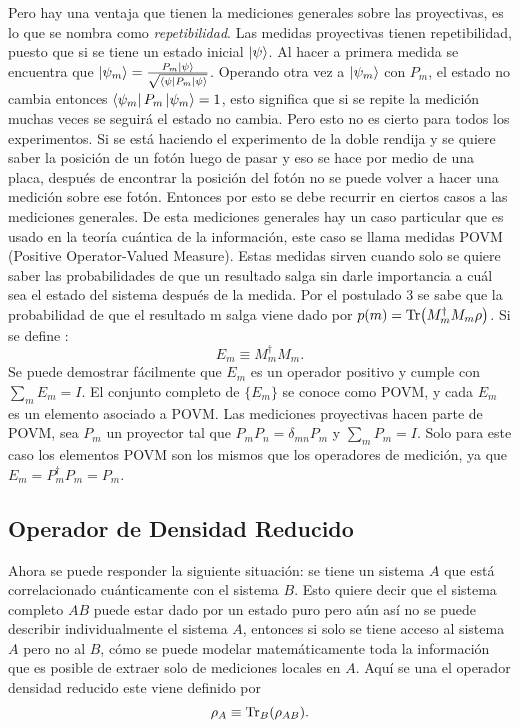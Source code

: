 Pero hay una ventaja que tienen  la mediciones generales sobre las proyectivas, es lo que se nombra como \textit{repetibilidad}. Las medidas proyectivas tienen repetibilidad, puesto que si se tiene un estado inicial $\ket{\psi}$. Al hacer a primera medida se encuentra que $\ket{\psi_{m}}=\frac{P_{m}\ket{\psi}}{\sqrt{\bra{\psi}P_{m}\ket{\psi}}}$. Operando otra vez a $\ket{\psi_{m}}$ con $P_{m}$, el estado no cambia entonces $\bra{\psi_{m}}P_{m}\ket{\psi_{m}}=1$, esto significa que si se repite la medición muchas veces se seguirá el estado no cambia. Pero esto no es cierto para todos los experimentos. Si se está haciendo el experimento de la doble rendija y se quiere saber la posición de un fotón luego de pasar y eso se hace por medio de una placa, después de encontrar la posición del fotón no se puede volver a hacer una medición  sobre ese fotón. Entonces por esto se debe recurrir en ciertos casos a las mediciones generales. De esta mediciones generales hay un caso particular que es usado en la teoría cuántica de la información, este caso se llama medidas POVM (Positive Operator-Valued Measure). Estas medidas sirven cuando solo se quiere saber las probabilidades de que un resultado salga sin darle importancia a cuál sea el estado del sistema después de la medida.
Por el postulado 3 se sabe que la probabilidad de que el resultado m salga viene dado por $p(m)= \Tr (M^{\dagger}_{m}M_{m} \rho)$. Si se define :
\begin{equation}
E_{m} \equiv M^{\dagger}_{m}M_{m}.
\end{equation}
Se puede demostrar fácilmente que $E_{m}$ es un operador positivo y cumple con $\sum_{m} E_{m}=I$. El conjunto completo de $ \{ E_{m}\}$ se conoce como POVM, y cada $E_{m}$ es un elemento asociado a POVM. Las mediciones proyectivas hacen parte de POVM, sea $P_{m}$ un proyector tal que $P_{m}P_{n}= \delta_{mn}P_{m}$ y $\sum_{m}P_{m}=I$. Solo para este caso los elementos POVM son los mismos que los operadores de medición, ya que $E_{m}=P_{m}^{\dagger}P_{m}=P_{m}$.

\subsection{Operador de Densidad Reducido}

Ahora se puede responder la siguiente situación: se tiene un sistema $A$ que está correlacionado cuánticamente  con el sistema $B$. Esto quiere decir que el sistema completo $AB$ puede estar dado por un estado puro pero aún así no se puede describir individualmente el sistema $A$, entonces si solo se tiene acceso al sistema $A$ pero no al $B$, cómo se puede modelar matemáticamente toda la información que es posible de extraer solo de mediciones locales en $A$. Aquí se una el operador densidad reducido este viene definido por 
\begin{equation}
\rho_{A} \equiv \Tr_{B}(\rho_{AB}).
\end{equation}

